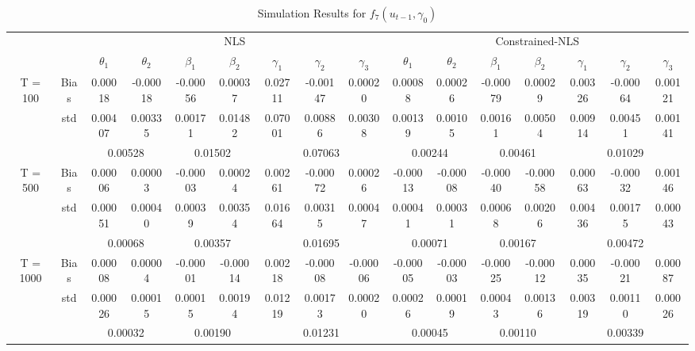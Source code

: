 \documentclass[a4paper,12pt,times,numbered,print,index]{report}
\numberwithin{equation}{section}
\begin{document}
	\begin{table}[htbp]
		\centering
		\caption{Simulation Results for $f_7 (u_{t-1}, \gamma_0)$}
		\begin{adjustbox}{max width=\textwidth}
			\begin{tabular}{cccccccccccccccc}
				\toprule
				&       & \multicolumn{7}{c}{NLS}                               & \multicolumn{7}{c}{Constrained-NLS} \\
				&       & $\theta_1$ & $\theta_2$ & $\beta_1$ & $\beta_2$ & $\gamma_1$ & $\gamma_2$ & $\gamma_3$ & $\theta_1$ & $\theta_2$ & $\beta_1$ & $\beta_2$ & $\gamma_1$ & $\gamma_2$ & $\gamma_3$ \\
				\midrule
				\multirow{3}[1]{*}{T = 100} & Bias  & 0.00018 & -0.00018 & -0.00056 & 0.00037 & 0.02711 & -0.00147 & 0.00020 & 0.00088 & 0.00026 & -0.00079 & 0.00029 & 0.00326 & -0.00064 & 0.00121 \\
				& std   & 0.00407 & 0.00335 & 0.00171 & 0.01482 & 0.07001 & 0.00886 & 0.00308 & 0.00139 & 0.00105 & 0.00161 & 0.00504 & 0.00914 & 0.00451 & 0.00141 \\
				&       & \multicolumn{2}{c}{0.00528} & \multicolumn{2}{c}{0.01502} & \multicolumn{3}{c}{0.07063} & \multicolumn{2}{c}{0.00244} & \multicolumn{2}{c}{0.00461} & \multicolumn{3}{c}{0.01029} \\
				\multirow{3}[0]{*}{T = 500} & Bias  & 0.00006 & 0.00003 & -0.00003 & 0.00024 & 0.00261 & -0.00072 & 0.00026 & -0.00013 & -0.00008 & -0.00040 & -0.00058 & 0.00063 & -0.00032 & 0.00146 \\
				& std   & 0.00051 & 0.00040 & 0.00039 & 0.00354 & 0.01664 & 0.00315 & 0.00047 & 0.00041 & 0.00031 & 0.00068 & 0.00206 & 0.00436 & 0.00175 & 0.00043 \\
				&       & \multicolumn{2}{c}{0.00068} & \multicolumn{2}{c}{0.00357} & \multicolumn{3}{c}{0.01695} & \multicolumn{2}{c}{0.00071} & \multicolumn{2}{c}{0.00167} & \multicolumn{3}{c}{0.00472} \\
				\multirow{3}[1]{*}{T = 1000} & Bias  & 0.00008 & 0.00004 & -0.00001 & -0.00014 & 0.00218 & -0.00008 & -0.00006 & -0.00005 & -0.00003 & -0.00025 & -0.00012 & 0.00035 & -0.00021 & 0.00087 \\
				& std   & 0.00026 & 0.00015 & 0.00015 & 0.00194 & 0.01219 & 0.00173 & 0.00020 & 0.00026 & 0.00019 & 0.00043 & 0.00136 & 0.00319 & 0.00110 & 0.00026 \\
				&       & \multicolumn{2}{c}{0.00032} & \multicolumn{2}{c}{0.00190} & \multicolumn{3}{c}{0.01231} & \multicolumn{2}{c}{0.00045} & \multicolumn{2}{c}{0.00110} & \multicolumn{3}{c}{0.00339} \\
				\bottomrule
				\bottomrule
			\end{tabular}%
		\end{adjustbox}
		\label{s_f7}%
	\end{table}%
	\pagebreak
	
\end{document}
